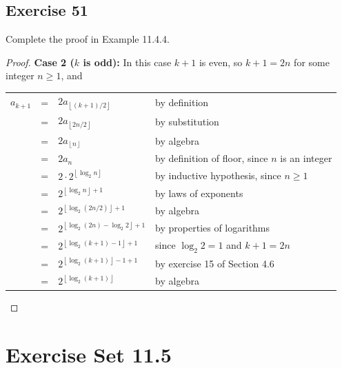 \documentclass[14pt]{extarticle}
\newcommand{\cy}{\color{cyan}}
\newcommand{\floor}[1]{{\left\lfloor#1\right\rfloor}}
\begin{document}
\subsection{Exercise 51}
Complete the proof in Example 11.4.4.
\begin{proof}
    {\bf Case 2 (\(k\) is odd):} In this case \(k+1\) is even, so \(k+1 = 2n\) for some integer \(n \geq 1\), and
    \begin{center}
        \begin{tabular}{rcll}
            \(a_{k+1}\) & = & \(2a_{\floor{(k+1)/2}}\)                   & {\cy by definition}                                     \\
                        & = & \(2a_{\floor{2n/2}}\)                      & {\cy by substitution}                                   \\
                        & = & \(2a_{\floor{n}}\)                         & {\cy by algebra}                                        \\
                        & = & \(2a_n\)                                   & {\cy by definition of floor, since \(n\) is an integer} \\
                        & = & \(2 \cdot 2^{\floor{\log_2 n}}\)           & {\cy by inductive hypothesis, since \(n \geq 1\)}       \\
                        & = & \(2^{\floor{\log_2 n} + 1}\)               & {\cy by laws of exponents}                              \\
                        & = & \(2^{\floor{\log_2 (2n/2)} + 1}\)          & {\cy by algebra}                                        \\
                        & = & \(2^{\floor{\log_2 (2n) - \log_2 2} + 1}\) & {\cy by properties of logarithms}                       \\
                        & = & \(2^{\floor{\log_2 (k+1) - 1} + 1}\)       & {\cy since \(\log_2 2 = 1\) and \(k+1 = 2n\)}           \\
                        & = & \(2^{\floor{\log_2 (k+1)} - 1 + 1}\)       & {\cy by exercise 15 of Section 4.6}                     \\
                        & = & \(2^{\floor{\log_2 (k+1)}}\)               & {\cy by algebra}
        \end{tabular}
    \end{center}
\end{proof}

\section{Exercise Set 11.5}
\end{document}

